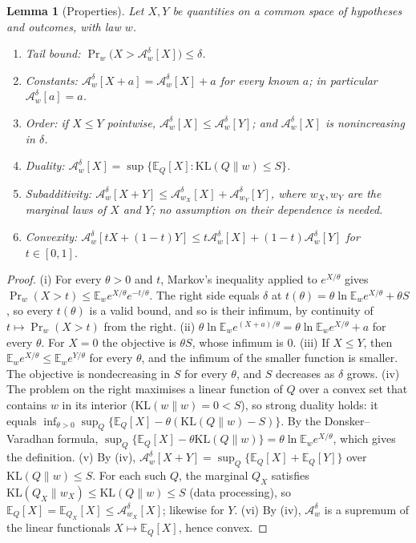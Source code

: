 \documentclass[11pt]{article}
\newtheorem{lemma}[theorem]{Lemma}
\theoremstyle{definition}
\theoremstyle{remark}
\newcommand{\A}{\mathcal{A}}
\newcommand{\E}{\mathbb{E}}
\renewcommand{\Pr}{\operatorname{Pr}}
\begin{document}
\begin{lemma}[Properties]\label{lem:props}
Let $X,Y$ be quantities on a common space of hypotheses and outcomes, with law $w$.
\begin{enumerate}
\item[(i)] Tail bound: $\Pr_w\big(X>\A^\delta_w[X]\big)\le\delta$.
\item[(ii)] Constants: $\A^\delta_w[X+a]=\A^\delta_w[X]+a$ for every known $a$; in particular $\A^\delta_w[a]=a$.
\item[(iii)] Order: if $X\le Y$ pointwise, $\A^\delta_w[X]\le\A^\delta_w[Y]$; and $\A^\delta_w[X]$ is nonincreasing in $\delta$.
\item[(iv)] Duality: $\A^\delta_w[X]=\sup\{\E_Q[X]:\mathrm{KL}(Q\|w)\le S\}$.
\item[(v)] Subadditivity: $\A^\delta_w[X+Y]\le\A^\delta_{w_X}[X]+\A^\delta_{w_Y}[Y]$, where $w_X,w_Y$ are the marginal laws of $X$ and $Y$; no assumption on their dependence is needed.
\item[(vi)] Convexity: $\A^\delta_w[tX+(1-t)Y]\le t\A^\delta_w[X]+(1-t)\A^\delta_w[Y]$ for $t\in[0,1]$.
\end{enumerate}
\end{lemma}
\begin{proof}
(i) For every $\theta>0$ and $t$, Markov's inequality applied to $e^{X/\theta}$ gives $\Pr_w(X>t)\le\E_w e^{X/\theta}e^{-t/\theta}$. The right side equals $\delta$ at $t(\theta)=\theta\ln\E_we^{X/\theta}+\theta S$, so every $t(\theta)$ is a valid bound, and so is their infimum, by continuity of $t\mapsto\Pr_w(X>t)$ from the right.
(ii) $\theta\ln\E_we^{(X+a)/\theta}=\theta\ln\E_we^{X/\theta}+a$ for every $\theta$. For $X=0$ the objective is $\theta S$, whose infimum is $0$.
(iii) If $X\le Y$, then $\E_we^{X/\theta}\le\E_we^{Y/\theta}$ for every $\theta$, and the infimum of the smaller function is smaller. The objective is nondecreasing in $S$ for every $\theta$, and $S$ decreases as $\delta$ grows.
(iv) The problem on the right maximises a linear function of $Q$ over a convex set that contains $w$ in its interior ($\mathrm{KL}(w\|w)=0<S$), so strong duality holds: it equals $\inf_{\theta>0}\sup_Q\{\E_Q[X]-\theta(\mathrm{KL}(Q\|w)-S)\}$. By the Donsker--Varadhan formula, $\sup_Q\{\E_Q[X]-\theta\mathrm{KL}(Q\|w)\}=\theta\ln\E_we^{X/\theta}$, which gives the definition.
(v) By (iv), $\A^\delta_w[X+Y]=\sup_Q\{\E_Q[X]+\E_Q[Y]\}$ over $\mathrm{KL}(Q\|w)\le S$. For each such $Q$, the marginal $Q_X$ satisfies $\mathrm{KL}(Q_X\|w_X)\le\mathrm{KL}(Q\|w)\le S$ (data processing), so $\E_Q[X]=\E_{Q_X}[X]\le\A^\delta_{w_X}[X]$; likewise for $Y$.
(vi) By (iv), $\A^\delta_w$ is a supremum of the linear functionals $X\mapsto\E_Q[X]$, hence convex.
\end{proof}
\end{document}
